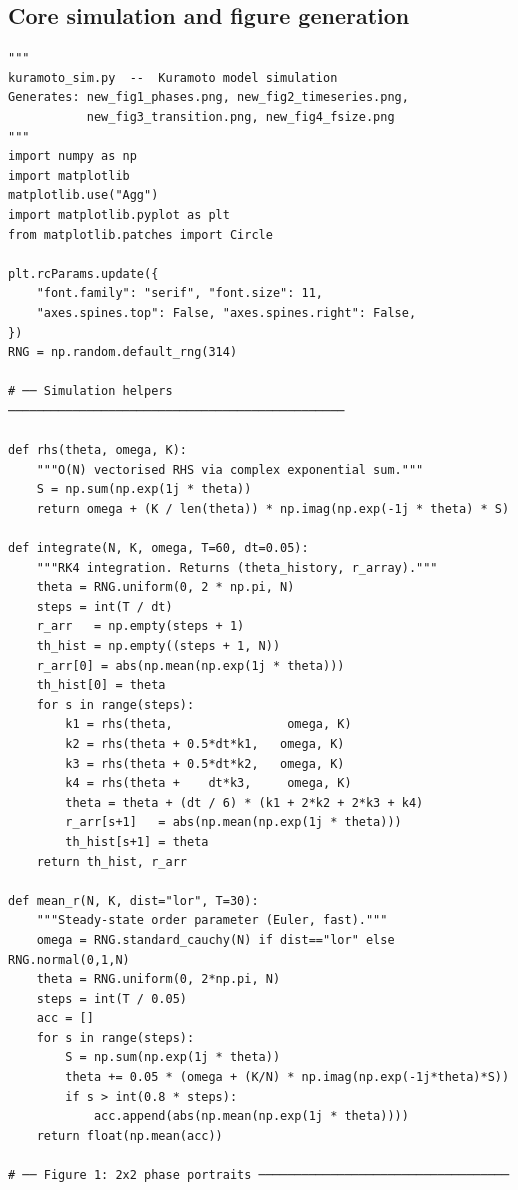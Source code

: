 \documentclass[12pt,a4paper]{article}
\begin{document}
\subsection*{Core simulation and figure generation}

\begin{lstlisting}[caption={%
  Complete Kuramoto simulation code. Generates all four figures.},
  label={lst:main}]
"""
kuramoto_sim.py  --  Kuramoto model simulation
Generates: new_fig1_phases.png, new_fig2_timeseries.png,
           new_fig3_transition.png, new_fig4_fsize.png
"""
import numpy as np
import matplotlib
matplotlib.use("Agg")
import matplotlib.pyplot as plt
from matplotlib.patches import Circle

plt.rcParams.update({
    "font.family": "serif", "font.size": 11,
    "axes.spines.top": False, "axes.spines.right": False,
})
RNG = np.random.default_rng(314)

# ── Simulation helpers ───────────────────────────────────────────────

def rhs(theta, omega, K):
    """O(N) vectorised RHS via complex exponential sum."""
    S = np.sum(np.exp(1j * theta))
    return omega + (K / len(theta)) * np.imag(np.exp(-1j * theta) * S)

def integrate(N, K, omega, T=60, dt=0.05):
    """RK4 integration. Returns (theta_history, r_array)."""
    theta = RNG.uniform(0, 2 * np.pi, N)
    steps = int(T / dt)
    r_arr   = np.empty(steps + 1)
    th_hist = np.empty((steps + 1, N))
    r_arr[0] = abs(np.mean(np.exp(1j * theta)))
    th_hist[0] = theta
    for s in range(steps):
        k1 = rhs(theta,                omega, K)
        k2 = rhs(theta + 0.5*dt*k1,   omega, K)
        k3 = rhs(theta + 0.5*dt*k2,   omega, K)
        k4 = rhs(theta +    dt*k3,     omega, K)
        theta = theta + (dt / 6) * (k1 + 2*k2 + 2*k3 + k4)
        r_arr[s+1]   = abs(np.mean(np.exp(1j * theta)))
        th_hist[s+1] = theta
    return th_hist, r_arr

def mean_r(N, K, dist="lor", T=30):
    """Steady-state order parameter (Euler, fast)."""
    omega = RNG.standard_cauchy(N) if dist=="lor" else RNG.normal(0,1,N)
    theta = RNG.uniform(0, 2*np.pi, N)
    steps = int(T / 0.05)
    acc = []
    for s in range(steps):
        S = np.sum(np.exp(1j * theta))
        theta += 0.05 * (omega + (K/N) * np.imag(np.exp(-1j*theta)*S))
        if s > int(0.8 * steps):
            acc.append(abs(np.mean(np.exp(1j * theta))))
    return float(np.mean(acc))

# ── Figure 1: 2x2 phase portraits ───────────────────────────────────


\end{lstlisting}
\end{document}
